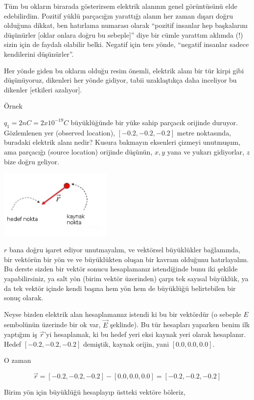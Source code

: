 \documentclass[12pt,fleqn]{article}\usepackage{../../common}
\begin{document}
Tüm bu okların birarada gösterirsem elektrik alanının genel görüntüsünü
elde edebilirdim. Pozitif yüklü parçacığın yarattığı alanın her zaman
dışarı doğru olduğuna dikkat, ben hatırlama numarası olarak ``pozitif
insanlar hep başkalarını düşünürler [oklar onlara doğru bu sebeple]'' diye
bir cümle yarattım aklımda (!) sizin için de faydalı olabilir
belki. Negatif için ters yönde, ``negatif insanlar sadece kendilerini
düşünürler''.

Her yönde giden bu okların olduğu resim önemli, elektrik alanı bir tür
kirpi gibi düşünüyoruz, dikenleri her yönde gidiyor, tabii uzaklaştıkça
daha inceliyor bu dikenler [etkileri azalıyor].

Örnek

$q_1 = 2nC = 2 x 10^{-19} C$ büyüklüğünde bir yüke sahip parçacık orijinde
duruyor. Gözlemlenen yer (observed location), $[-0.2, -0.2, -0.2]$ metre
noktasında, buradaki elektrik alanı nedir? Kusura bakmayın eksenleri
çizmeyi unutmuşum, ama parçacığı (source location) orijinde düşünün, $x,y$
yana ve yukarı gidiyorlar, $z$ bize doğru geliyor.

\includegraphics[width=15em]{elecmag_08.png}

$r$ bana doğru işaret ediyor unutmayalım, ve vektörsel büyüklükler
bağlamında, bir vektörün bir yön ve ve büyüklükten oluşan bir kavram
olduğunu hatırlayalım. Bu derste sizden bir vektör sonucu hesaplamanız
istendiğinde bunu iki şekilde yapabilirsiniz, ya salt yön (birim vektör
üzerinden) çarpı tek sayısal büyüklük, ya da tek vektör içinde kendi başına
hem yön hem de büyüklüğü belirtebilen bir sonuç olarak.

Neyse bizden elektrik alan hesaplamamız istendi ki bu bir vektördür (o
sebeple $E$ sembolünün üzerinde bir ok var, $\vec{E}$ şeklinde). Bu tür
hesapları yaparken benim ilk yaptığım iş $\vec{r}$'yi hesaplamak, ki bu
hedef yeri eksi kaynak yeri olarak hesaplanır. Hedef $[-0.2, -0.2, -0.2]$
demiştik, kaynak orijin, yani $[0.0, 0.0, 0.0]$.

O zaman

$$
\vec{r} = [-0.2, -0.2, -0.2]-[0.0, 0.0, 0.0]=[-0.2, -0.2, -0.2]
$$

Birim yön için büyüklüğü hesaplayıp üstteki vektöre böleriz,
\end{document}
